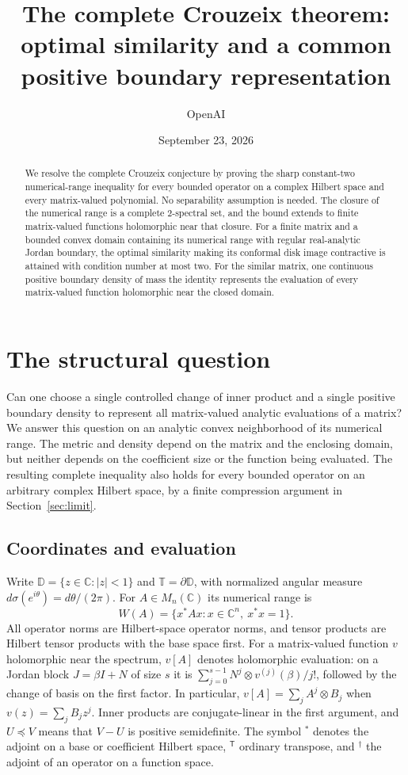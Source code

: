 \documentclass[11pt]{article}
\title{The complete Crouzeix theorem:\\
optimal similarity and a common positive boundary representation}
\author{OpenAI}
\date{September 23, 2026}
\newcommand{\C}{\mathbb C}
\newcommand{\D}{\mathbb D}
\newcommand{\T}{\mathbb T}
\theoremstyle{definition}
\theoremstyle{remark}
\numberwithin{equation}{section}
\begin{document}
\maketitle\thispagestyle{fancy}

\begin{abstract}
We resolve the complete Crouzeix conjecture by proving the sharp
constant-two numerical-range inequality for every bounded operator on a
complex Hilbert space and every matrix-valued polynomial. No separability
assumption is needed. The closure of the numerical range is a complete
$2$-spectral set, and the bound extends to finite matrix-valued functions
holomorphic near that closure. For a finite matrix and a bounded convex
domain containing its numerical range with regular real-analytic Jordan
boundary, the optimal similarity making its conformal disk image contractive
is attained with condition number at most two. For the similar matrix, one
continuous positive boundary density of mass the identity represents the
evaluation of every matrix-valued function holomorphic near the closed domain.
\end{abstract}

\section{The structural question}
Can one choose a single controlled change of inner product and a single
positive boundary density to represent all matrix-valued analytic evaluations
of a matrix? We answer this question on an analytic convex neighborhood of
its numerical range. The metric and density depend on the matrix and the
enclosing domain, but neither depends on the coefficient size or the function
being evaluated. The resulting complete inequality also holds for every
bounded operator on an arbitrary complex Hilbert space, by a finite
compression argument in Section~\ref{sec:limit}.

\subsection*{Coordinates and evaluation}
Write $\D=\{z\in\C:|z|<1\}$ and $\T=\partial\D$, with normalized
angular measure $d\sigma(e^{i\theta})=d\theta/(2\pi)$. For
$A\in M_n(\C)$ its numerical range is
\[
 W(A)=\{x^*Ax:x\in\C^n,\ x^*x=1\}.
\]
All operator norms are Hilbert-space operator norms, and tensor products are
Hilbert tensor products with the base space first. For a matrix-valued function $v$
holomorphic near the spectrum, $v[A]$ denotes holomorphic evaluation:
on a Jordan block $J=\beta I+N$ of size $s$ it is
$\sum_{j=0}^{s-1}N^j\otimes v^{(j)}(\beta)/j!$, followed by the
change of basis on the first factor. In particular,
$v[A]=\sum_jA^j\otimes B_j$ when $v(z)=\sum_jB_jz^j$.
Inner products are conjugate-linear in the first argument, and $U\preceq V$
means that $V-U$ is positive semidefinite. The symbol ${}^*$ denotes the
adjoint on a base or coefficient Hilbert space, ${}^{\mathsf T}$ ordinary
transpose, and ${}^\dagger$ the adjoint of an operator on a function space.
\end{document}

